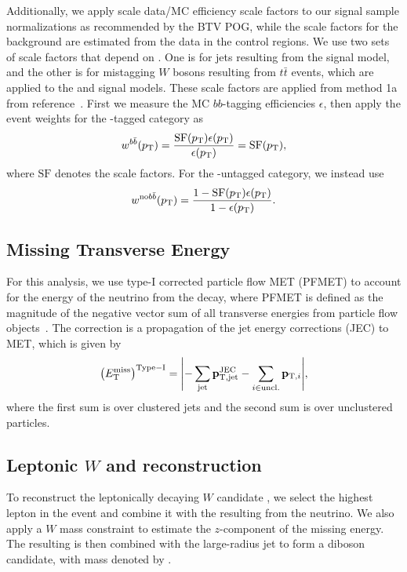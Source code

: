 Additionally, we apply scale data/MC efficiency scale factors to our signal sample normalizations as recommended by the BTV POG, while the scale factors for the background are estimated from the data in the control regions.
We use two sets of scale factors that depend on \ptjet.
One is for \Htobbbar jets resulting from the \WprtoWHtolnubbbar signal model, and the other is for mistagging $W$ bosons resulting from $t\bar{t}$ events, which are applied to the \GBulktoWWtolnuqqbarpr and \WprtoWZtolnuqqbar signal models.
These scale factors are applied from method 1a from reference~\cite{bTaggingEff}.
First we measure the MC $bb$-tagging efficiencies $\epsilon$, then apply the event weights for the \bbbar-tagged category as
\begin{equation}
  w^{b\bar{b}}(p_\mathrm{T})=\frac{\mathrm{SF}(p_\mathrm{T})\epsilon(p_\mathrm{T})}{\epsilon(p_\mathrm{T})}=\mathrm{SF}(p_\mathrm{T}),
\end{equation}
where $\mathrm{SF}$ denotes the scale factors.
For the \bbbar-untagged category, we instead use
\begin{equation}
  w^{\mathrm{no}b\bar{b}}(p_\mathrm{T})=\frac{1-\mathrm{SF}(p_\mathrm{T})\epsilon(p_\mathrm{T})}{1-\epsilon(p_\mathrm{T})}.
\end{equation}

\subsection{Missing Transverse Energy}

For this analysis, we use type-I corrected particle flow MET (PFMET) to account for the energy of the neutrino from the \Wlep decay, where PFMET is defined as the magnitude of the negative vector sum of all transverse energies from particle flow objects~\cite{PFMET}.
The correction is a propagation of the jet energy corrections (JEC) to MET, which is given by
\begin{equation}
  \EtmissTI=\vqty{-\sum_\mathrm{jet}\mathbf{p}_\mathrm{T,jet}^\mathrm{JEC}-\sum_{i\in\mathrm{uncl.}}\mathbf{p}_{\mathrm{T},i}},
\end{equation}
where the first sum is over clustered jets and the second sum is over unclustered particles.

\subsection{Leptonic $W$ and \WV reconstruction}

To reconstruct the leptonically decaying $W$ candidate \Wlep, we select the highest \pt lepton in the event and combine it with the \EtmissTI resulting from the neutrino.
We also apply a $W$ mass constraint to estimate the $z$-component of the missing energy.
The resulting \Wlep is then combined with the large-radius \Vhad jet to form a diboson candidate, with mass denoted by \MVV.

